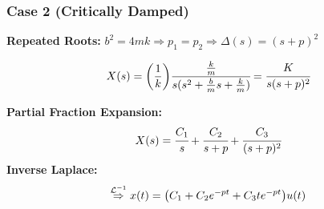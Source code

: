\documentclass[aspectratio=169,handout]{beamer}
\begin{document}
\begin{frame}
	\frametitle{Case 2 (Critically Damped)}


	\textbf{Repeated Roots:}
	\(
		b^2 = 4mk \Rightarrow p_1 = p_2 
		\Rightarrow \Delta(s) = {(s+p)}^2
	\)

	\pause{}
	\[
		X(s) = \qty(\frac{1}{k}) \cfrac{\frac{k}{m}}{s(s^2 + \frac{b}{m} s + \frac{k}{m})}
		= \cfrac{K}{s (s+p)^2} 
	\]
	\pause{}

	\textbf{Partial Fraction Expansion:} %
	\[
		X(s) = \cfrac{C_1}{s} + \cfrac{C_2}{s+p} + \cfrac{C_3}{(s+p)^2}
	\]
	\pause{}
	\textbf{Inverse Laplace:}
	\[
		\overset{\mathcal{L}^{-1}}{\Rightarrow}
		x(t) = \qty(C_1 + C_2 e^{-pt} + C_3 t e^{-pt}) u(t)	
	\]




\end{frame}
\end{document}
